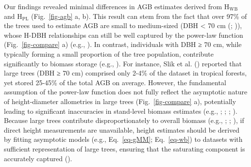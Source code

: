 \documentclass[
  12pt,
  letterpaper,
  DIV=11,
  numbers=noendperiod]{scrartcl}
\begin{document}
Our findings revealed minimal differences in AGB estimates derived from
\(\text{H}_\text{WB}\) and \(\text{H}_\text{PL}\) (Fig.~\ref{fig-agb} a,
b). This result can stem from the fact that over 97\% of the trees used
to estimate AGB are small to medium-sized (DBH \textless{} 70 cm
(;
)), whose H-DBH
relationships can still be well captured by the power-law function
(Fig.~\ref{fig-compare} a) (e.g., ). In contrast, individuals with DBH ≥ 70 cm, while typically
forming a small proportion of the tree population, contribute
significantly to biomass storage (e.g., ). For instance, Slik et al. ()
reported that large trees (DBH ≥ 70 cm) comprised only 2-4\% of the
dataset in tropical forests, yet stored 25-45\% of the total AGB on
average. However, the fundamental assumption of the power-law function
does not fully reflect the asymptotic nature of height-diameter
allometries in large trees (Fig.~\ref{fig-compare} a), potentially
leading to significant inaccuracies in stand-level biomass estimates
(e.g., ;
;
;
). Because
large trees contribute disproportionately to overall biomass (e.g.,
;
;
), if direct height
measurements are unavailable, height estimates should be derived by
fitting asymptotic models (e.g., Eq.~\ref{eq-gMM}; Eq.~\ref{eq-wb}) to
datasets with sufficient representation of large trees, ensuring that
the saturating component is accurately captured
().
\end{document}

